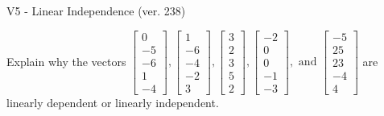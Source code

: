 \begin{exercise}
  \begin{exerciseTitle}V5 - Linear Independence (ver. 238)\end{exerciseTitle}
  \begin{exerciseStatement}
    Explain why the vectors \(\left[\begin{array}{r}
0 \\
-5 \\
-6 \\
1 \\
-4
\end{array}\right] , \left[\begin{array}{r}
1 \\
-6 \\
-4 \\
-2 \\
3
\end{array}\right] , \left[\begin{array}{r}
3 \\
2 \\
3 \\
5 \\
2
\end{array}\right] , \left[\begin{array}{r}
-2 \\
0 \\
0 \\
-1 \\
-3
\end{array}\right] , \text{ and } \left[\begin{array}{r}
-5 \\
25 \\
23 \\
-4 \\
4
\end{array}\right]\) are linearly dependent or linearly independent.	



\end{exerciseStatement}
\end{exercise}
